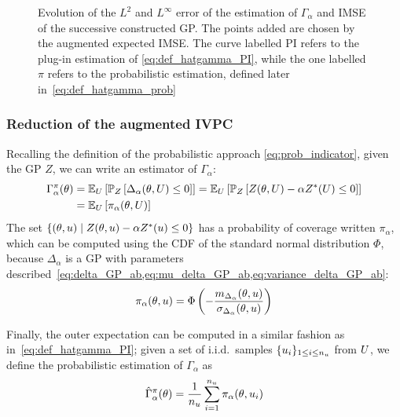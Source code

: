 \documentclass[../../Main_ManuscritThese.tex]{subfiles}
\newcommand\imgpath{/home/victor/acadwriting/Manuscrit/Text/Chapter4/img/}
\begin{document}
\begin{figure}[ht]
  \centering
  
  \caption[Augmented IMSE for the estimation of
  $\Gamma_{\alpha}$]{\label{fig:IMSE_enrichment} Evolution of the
    $L^2$ and $L^\infty$ error of the estimation of $\Gamma_\alpha$
    and IMSE of the successive constructed GP. The points added are
    chosen by the augmented expected IMSE. The curve labelled
    $\mathrm{PI}$ refers to the plug-in estimation of
    \cref{eq:def_hatgamma_PI}, while the one labelled $\pi$ refers to
    the probabilistic estimation, defined later in~\cref{eq:def_hatgamma_prob}}
\end{figure}


\subsubsection{Reduction of the augmented IVPC}

Recalling the definition of the probabilistic approach
\cref{eq:prob_indicator}, given the GP $Z$, we can write an estimator
of $\Gamma_{\alpha}$:
\begin{align}
  \label{eq:def_gamma_prob}
  \Gamma_{\alpha}^{\pi}(\kk) &= \Ex_U\left[ \Prob_{Z}\left[ \Delta_{\alpha}(\kk,\UU) \leq 0\right]\right] = \Ex_U\left[ \Prob_{Z}\left[ Z(\kk, \UU) - \alpha Z^*(\UU) \leq 0\right]\right] \\
                                   &= \Ex_U\left[\pi_{\alpha}(\kk,\UU)\right]%
\end{align}
The set $\{(\theta, u) \mid Z(\theta, u) - \alpha Z^*(u)\leq 0\}$ has
a probability of coverage written $\pi_{\alpha}$, which can be
computed using the CDF of the standard normal distribution $\Phi$,
because $\Delta_{\alpha}$ is a GP with parameters
described~\cref{eq:delta_GP_ab,eq:mu_delta_GP_ab,eq:variance_delta_GP_ab}:
\begin{equation}
  \label{eq:def_pialphaku}
  \pi_{\alpha}(\theta,u) = \Phi\left(-\frac{m_{\Delta_\alpha}(\theta,u)}{\sigma_{\Delta_\alpha}(\theta,u)}\right)
\end{equation}


Finally, the outer expectation can be computed in a similar fashion as
in~\cref{eq:def_hatgamma_PI}; given a set of i.i.d.\ samples
$\{u_i\}_{1\leq i\leq n_{u}}$ from $U$, we define the
probabilistic estimation of $\Gamma_{\alpha}$ as
\begin{equation}
  \label{eq:def_hatgamma_prob}
  \hat{\Gamma}_{\alpha}^{\pi}(\theta) = \frac{1}{n_{u}}\sum_{i=1}^{n_{u}} \pi_{\alpha}(\theta, u_i)
\end{equation}
\end{document}
